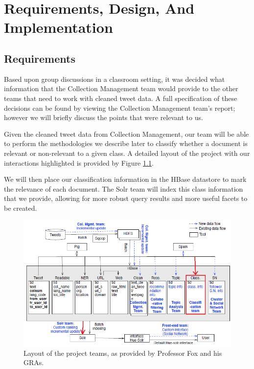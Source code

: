 \chapter[Requirements, Design, and Implementation]{Requirements, Design, And\\ Implementation}\label{ch:ReqDesignImp}
\section{Requirements}
Based upon group discussions in a classroom setting, it was decided what information that the Collection Management team would provide to the other teams that need to work with cleaned tweet data. A full specification of these decisions can be found by viewing the Collection Management team's report; however we will briefly discuss the points that were relevant to us.

Given the cleaned tweet data from Collection Management, our team will be able to perform the methodologies we describe later to classify whether a document is relevant or non-relevant to a given class. A detailed layout of the project with our interactions highlighted is provided by Figure \ref{fig:design}.

We will then place our classification information in the HBase datastore to mark the relevance of each document. The Solr team will index this class information that we provide, allowing for more robust query results and more useful facets to be created.

\begin{figure}[ht]
	\centering
	\includegraphics[width=\textwidth]{figures/data_flow.png}
    \caption{Layout of the project teams, as provided by Professor Fox and his GRAs.}\label{fig:design}
\end{figure}

